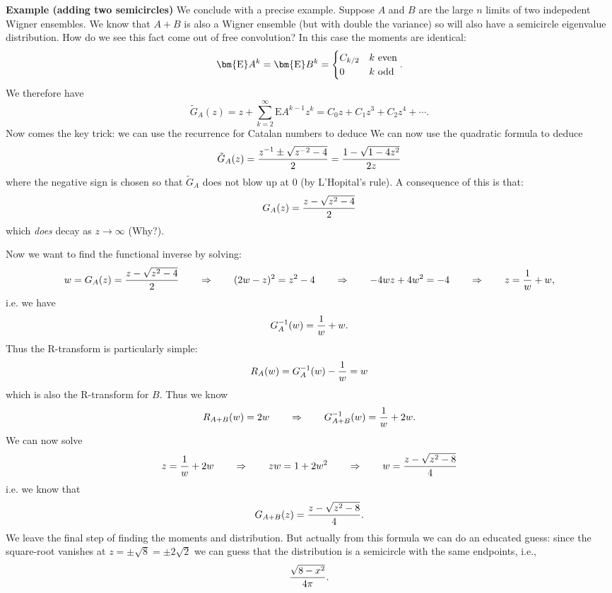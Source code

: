 \textbf{Example (adding two semicircles)} We conclude with a precise example. Suppose $A$ and $B$ are the large $n$ limits of two indepedent Wigner ensembles. We know that $A+B$ is also a Wigner ensemble (but with double the variance) so will also have a semicircle eigenvalue distribution. How do we see this fact come out of free convolution? In this case the moments are identical:
\[
\ensuremath{\bm{\mathrm{E}}} A^k = \ensuremath{\bm{\mathrm{E}}} B^k = \begin{cases} C_{k/2} & k\hbox{ even} \\
    0 & k\hbox{ odd} \end{cases}.
\]
We therefore have
\[
\tilde{G}_A(z) = z + \ensuremath{\sum}_{k=2}^\ensuremath{\infty} \ensuremath{\bm{\mathrm{E}}} A^{k-1} z^k = C_0 z + C_1 z^3 + C_2 z^4 + \ensuremath{\cdots}.
\]
Now comes the key trick: we can use the recurrence for Catalan numbers to deduce
We can now use the quadratic formula to deduce
\[
\tilde{G}_A(z) = {z^{-1} \ensuremath{\pm} \sqrt{z^{-2} -4} \over 2} = {1 - \sqrt{1 -4 z^2} \over 2 z}
\]
where the negative sign is chosen so that $\tilde{G}_A$ does not blow up at $0$ (by L'Hopital's rule).  A consequence of this is that:
\[
G_A(z) = {z - \sqrt{z^2 -4} \over 2}
\]
which \emph{does} decay as $z \ensuremath{\rightarrow} \ensuremath{\infty}$ (Why?). 

Now we want to find the functional inverse by solving:
\[
w = G_A(z) = {z - \sqrt{z^2 -4} \over 2}\qquad  \ensuremath{\Rightarrow} \qquad  (2w-z)^2 = z^2 - 4 \qquad \ensuremath{\Rightarrow} \qquad -4wz + 4w^2 = -4 \qquad  \ensuremath{\Rightarrow} \qquad  z = {1 \over w} +w,
\]
i.e. we have
\[
G_A^{-1}(w) = {1 \over w} +w.
\]
Thus the R-transform is particularly simple:
\[
R_A(w) = G_A^{-1}(w) - {1 \over w} = w
\]
which is also the R-transform for $B$. Thus we know
\[
R_{A+B}(w) = 2 w \qquad \ensuremath{\Rightarrow} \qquad G_{A+B}^{-1}(w) = {1 \over w} + 2w.
\]
We can now solve
\[
z = {1 \over w} + 2w \qquad \Rightarrow \qquad zw = 1 + 2w^2 \qquad \Rightarrow \qquad w = {z - \sqrt{z^2 - 8} \over 4}
\]
i.e. we know that
\[
G_{A+B}(z) = {z - \sqrt{z^2 - 8} \over 4}.
\]
We leave the final step of finding the moments and distribution. But actually from this formula we can do an educated guess: since the square-root vanishes at $z = \ensuremath{\pm}\sqrt{8} = \ensuremath{\pm}2 \sqrt{2}$ we can guess that the distribution is a semicircle with the same endpoints, i.e.,
\[
{\sqrt{8 - x^2} \over 4 \ensuremath{\pi}}.
\]
